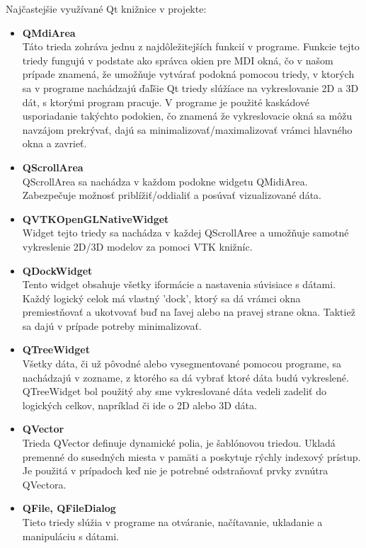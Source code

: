 \documentclass[a4paper,11pt,twoside]{article}%
\begin{document}
Najčastejšie využívané Qt knižnice v projekte:
\begin{itemize}
\item \textbf{QMdiArea}\\ 
Táto trieda zohráva jednu z najdôležitejších funkcií v programe. Funkcie tejto triedy fungujú v podstate ako správca okien pre MDI okná, čo v našom prípade znamená, že umožňuje vytvárať podokná pomocou triedy, v ktorých sa v programe nachádzajú ďaľšie Qt triedy slúžíace na vykreslovanie 2D a 3D dát, s ktorými program pracuje. V programe je použité kaskádové usporiadanie takýchto podokien, čo znamená že vykreslovacie okná sa môžu navzájom prekrývať, dajú sa minimalizovať/maximalizovať vrámci hlavného okna a zavrieť.

\item \textbf{QScrollArea} \\
QScrollArea sa nachádza v každom podokne widgetu QMidiArea. Zabezpečuje možnosť priblížiť/oddialiť a posúvať vizualizované dáta.  

\item \textbf{QVTKOpenGLNativeWidget} \\
Widget tejto triedy sa nachádza v každej QScrollAree a umožňuje samotné vykreslenie 2D/3D modelov za pomoci VTK knižníc. 

\item \textbf{QDockWidget} \\
Tento widget obsahuje všetky iformácie a nastavenia súvisiace s dátami. Každý logický celok má vlastný 'dock', ktorý sa dá vrámci okna premiestňovať a ukotvovať buď na ľavej alebo na pravej strane okna. Taktiež sa dajú v prípade potreby minimalizovať.

\item \textbf{QTreeWidget} \\ 
Všetky dáta, či už pôvodné alebo vysegmentované pomocou programe, sa nachádzajú v zozname, z ktorého sa dá vybrať ktoré dáta budú vykreslené. QTreeWidget bol použitý aby sme vykreslované dáta vedeli zadeliť do logických celkov, napríklad či ide o 2D alebo 3D dáta.

\item \textbf{QVector} \\
Trieda QVector definuje dynamické polia, je šablónovou triedou.
Ukladá premenné do susedných miesta v pamäti a poskytuje rýchly indexový prístup. Je použitá v prípadoch keď nie je potrebné odstraňovať prvky zvnútra QVectora.

\item \textbf{QFile, QFileDialog} \\
Tieto triedy slúžia v programe na otváranie, načítavanie, ukladanie a manipuláciu s dátami.

\end{itemize}
\end{document}
